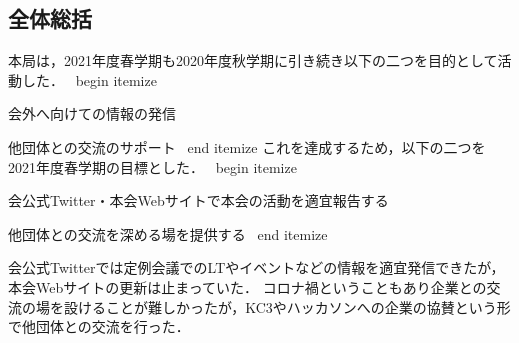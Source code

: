 \subsection*{全体総括}


本局は，2021年度春学期も2020年度秋学期に引き続き以下の二つを目的として活動した．
\ begin { itemize }
	\item 会外へ向けての情報の発信
	\item 他団体との交流のサポート
\ end { itemize }
これを達成するため，以下の二つを2021年度春学期の目標とした．
\ begin { itemize }
	\item 会公式Twitter・本会Webサイトで本会の活動を適宜報告する
	\item 他団体との交流を深める場を提供する
\ end { itemize }

会公式Twitterでは定例会議でのLTやイベントなどの情報を適宜発信できたが，本会Webサイトの更新は止まっていた．
コロナ禍ということもあり企業との交流の場を設けることが難しかったが，KC3やハッカソンへの企業の協賛という形で他団体との交流を行った．
